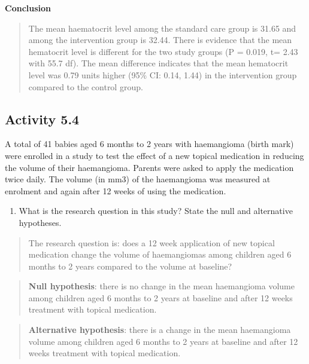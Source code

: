 \documentclass[
]{memoir}
\providecommand{\tightlist}{%
  \setlength{\itemsep}{0pt}\setlength{\parskip}{0pt}}
\begin{document}
\textbf{Conclusion}

\begin{quote}
The mean haematocrit level among the standard care group is 31.65 and among the intervention group is 32.44. There is evidence that the mean hematocrit level is different for the two study groups (P = 0.019, t= 2.43 with 55.7 df). The mean difference indicates that the mean hematocrit level was 0.79 units higher (95\% CI: 0.14, 1.44) in the intervention group compared to the control group.
\end{quote}

\hypertarget{activity-5.4}{%
\subsection*{Activity 5.4}\label{activity-5.4}}

A total of 41 babies aged 6 months to 2 years with haemangioma (birth mark) were enrolled in a study to test the effect of a new topical medication in reducing the volume of their haemangioma. Parents were asked to apply the medication twice daily. The volume (in mm3) of the haemangioma was measured at enrolment and again after 12 weeks of using the medication.

\begin{enumerate}
\def\labelenumi{\alph{enumi})}
\tightlist
\item
  What is the research question in this study? State the null and alternative hypotheses.
\end{enumerate}

\begin{quote}
The research question is: does a 12 week application of new topical medication change the volume of haemangiomas among children aged 6 months to 2 years compared to the volume at baseline?
\end{quote}

\begin{quote}
\textbf{Null hypothesis}: there is no change in the mean haemangioma volume among children aged 6 months to 2 years at baseline and after 12 weeks treatment with topical medication.
\end{quote}

\begin{quote}
\textbf{Alternative hypothesis}: there is a change in the mean haemangioma volume among children aged 6 months to 2 years at baseline and after 12 weeks treatment with topical medication.
\end{quote}
\end{document}
